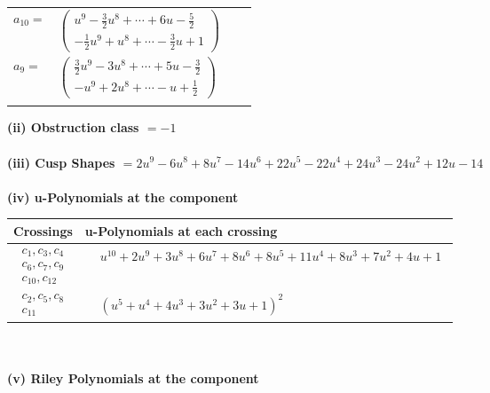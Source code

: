 \documentclass[1p]{elsarticle_modified}
\theoremstyle{definition}
\begin{document}
\begin{tabular}{m{7pt} m{180pt} m{7pt} m{180pt} }
\flushright $a_{10}=$&$\begin{pmatrix}u^9-\frac{3}{2} u^8+\cdots+6 u-\frac{5}{2}\\-\frac{1}{2} u^9+u^8+\cdots-\frac{3}{2} u+1\end{pmatrix}$ \\
\flushright $a_{9}=$&$\begin{pmatrix}\frac{3}{2} u^9-3 u^8+\cdots+5 u-\frac{3}{2}\\- u^9+2 u^8+\cdots- u+\frac{1}{2}\end{pmatrix}$\\&\end{tabular}
\flushleft \textbf{(ii) Obstruction class $= -1$}\\~\\
\flushleft \textbf{(iii) Cusp Shapes $= 2 u^9-6 u^8+8 u^7-14 u^6+22 u^5-22 u^4+24 u^3-24 u^2+12 u-14$}\\~\\
\newpage\renewcommand{\arraystretch}{1}
\flushleft \textbf{(iv) u-Polynomials at the component}\newline \\
\begin{tabular}{m{50pt}|m{274pt}}
Crossings & \hspace{64pt}u-Polynomials at each crossing \\
\hline $$\begin{aligned}c_{1},c_{3},c_{4}\\c_{6},c_{7},c_{9}\\c_{10},c_{12}\end{aligned}$$&$\begin{aligned}
&u^{10}+2 u^9+3 u^8+6 u^7+8 u^6+8 u^5+11 u^4+8 u^3+7 u^2+4 u+1
\end{aligned}$\\
\hline $$\begin{aligned}c_{2},c_{5},c_{8}\\c_{11}\end{aligned}$$&$\begin{aligned}
&(u^5+u^4+4 u^3+3 u^2+3 u+1)^2
\end{aligned}$\\
\hline
\end{tabular}\\~\\
\newpage\renewcommand{\arraystretch}{1}
\flushleft \textbf{(v) Riley Polynomials at the component}\newline \\
\end{document}
